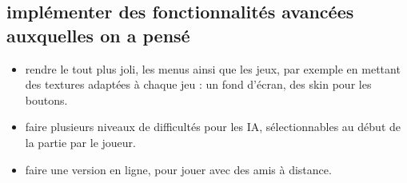 \documentclass{article}
\begin{document}
\subsection{implémenter des fonctionnalités avancées auxquelles on a pensé}

\begin{itemize}
\item rendre le tout plus joli, les menus ainsi que les jeux, par exemple en mettant des textures adaptées à chaque jeu : un fond d'écran, des skin pour les boutons.
    \item faire plusieurs niveaux de difficultés pour les IA, sélectionnables au début de la partie par le joueur.
    \item faire une version en ligne, pour jouer avec des amis à distance.
\end{itemize}
    
\end{document}
